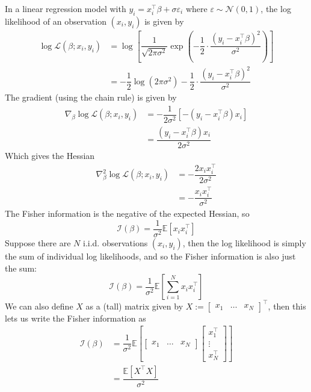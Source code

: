 \documentclass[11pt]{report} %
\begin{document}
In a linear regression model with $y_{i} = x_{i}^{\top}\beta + \sigma\varepsilon_{i}$ where $\varepsilon \sim \mathcal{N}\left(0, 1\right)$, the log likelihood of an observation $\left(x_{i}, y_{i}\right)$ is given by
\begin{align}
\log\mathcal{L}\left(\beta; x_{i}, y_{i}\right) &= \log\left[\dfrac{1}{\sqrt{2\pi\sigma^{2}}}\exp\left(-\dfrac{1}{2}\cdot\dfrac{\left(y_{i} - x_{i}^{\top}\beta\right)^{2}}{\sigma^{2}}\right)\right] \\
&= -\dfrac{1}{2}\log\left(2\pi\sigma^{2}\right) - \dfrac{1}{2}\cdot\dfrac{\left(y_{i} - x_{i}^{\top}\beta\right)^{2}}{\sigma^{2}}
\end{align}
The gradient (using the chain rule) is given by
\begin{align}
\nabla_{\beta}\log\mathcal{L}\left(\beta; x_{i}, y_{i}\right) &= -\dfrac{1}{2\sigma^{2}}\left[-\left(y_{i} - x_{i}^{\top}\beta\right)x_{i}\right] \\
&= \dfrac{\left(y_{i} - x_{i}^{\top}\beta\right)x_{i}}{2\sigma^{2}}
\end{align}
Which gives the Hessian
\begin{align}
\nabla_{\beta}^{2}\log\mathcal{L}\left(\beta; x_{i}, y_{i}\right) &= -\dfrac{2x_{i}x_{i}^{\top}}{2\sigma^{2}} \\
&= -\dfrac{x_{i}x_{i}^{\top}}{\sigma^{2}}
\end{align}
The Fisher information is the negative of the expected Hessian, so
\begin{equation}
\mathcal{I}\left(\beta\right) = \dfrac{1}{\sigma^{2}}\mathbb{E}\left[x_{i}x_{i}^{\top}\right]
\end{equation}
Suppose there are $N$ i.i.d. observations $\left(x_{i}, y_{i}\right)$, then the log likelihood is simply the sum of individual log likelihoods, and so the Fisher information is also just the sum:
\begin{equation}
\mathcal{I}\left(\beta\right) = \dfrac{1}{\sigma^{2}}\mathbb{E}\left[\sum_{i = 1}^{N}x_{i}x_{i}^{\top}\right]
\end{equation}
We can also define $X$ as a (tall) matrix given by $X := \begin{bmatrix} x_{1} & \dots & x_{N}\end{bmatrix}^{\top}$, then this lets us write the Fisher information as
\begin{align}
\mathcal{I}\left(\beta\right) &= \dfrac{1}{\sigma^{2}}\mathbb{E}\left[\begin{bmatrix} x_{1} & \dots & x_{N}\end{bmatrix}\begin{bmatrix} x_{1}^{\top} \\ \vdots \\ x_{N}^{\top}\end{bmatrix}\right] \\
&= \dfrac{\mathbb{E}\left[X^{\top}X\right]}{\sigma^{2}}
\end{align}
\end{document}

